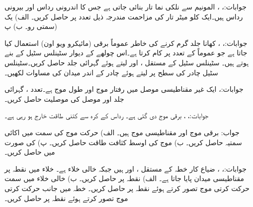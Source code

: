 جوابات:، ، 
المونیم  سے نلکی نما تار بنائی جاتی ہے جس کا اندرونی رداس  اور بیرونی رداس  ہیں۔ایک کلو میٹر تار کی مزاحمت مندرجہ ذیل تعدد پر حاصل کریں۔ الف) یک سمتی رو۔ ب) پ) 

جوابات:، ، 
کھانا جلد گرم کرنے کی خاطر عموماً برقی  (مائیکرو ویو اون)  استعمال کیا جاتا ہے جو عموماً  کے تعدد پر کام کرتا ہے۔اس چولھے کے دیوار سٹینلس سٹیل کے بنے ہوتے ہیں۔ سٹینلس سٹیل کے مستقل ،  اور  لیتے ہوئے گہرائی جلد  حاصل کریں۔سٹینلس سٹیل چادر کی سطح پر
  لیتے ہوئے چادر کے اندر میدان کی مساوات لکھیں۔

جوابات:،    
ایک غیر مقناطیسی موصل میں رفتار موج  اور طول موج  ہے۔تعدد ، گہرائی جلد   اور موصل کی موصلیت  حاصل کریں۔

جوابات:، ،   
برقی موج  دی گئی ہے۔ رداس  کے کرہ سے کتنی طاقت خارج ہو رہی ہے۔

جواب:
برقی موج  اور مقناطیسی موج
  ہیں۔ الف) حرکت موج کی سمت میں اکائی سمتیہ حاصل کریں۔ ب) موج کی اوسط کثافت طاقت حاصل کریں۔ پ)  کی صورت میں  حاصل کریں۔

جوابات:، ، 
ضیاع کار خطہ  کے مستقل ،  اور  ہیں  جبکہ  خالی خلاء ہے۔ خلاء میں نقطہ  پر مقناطیسی میدان  پایا جاتا ہے۔ الف) نقطہ  پر  حاصل کریں۔ ب) خالی خلاء میں  سمت حرکت کرتی موج تصور کرتے ہوئے  نقطہ  پر
  حاصل کریں۔ خطہ  میں  جانب حرکت کرتی موج تصور کرتے ہوئے  نقطہ  پر  حاصل کریں۔


